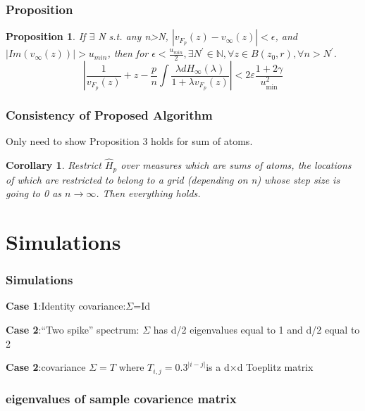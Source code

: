 \documentclass[aspectratio=169, 10pt, utf8, mathserif]{beamer}
\newtheorem{prop}{Proposition}
\newtheorem{cor}{Corollary}
\begin{document}
\begin{frame}
\frametitle{Proposition}
\begin{prop}
If $\exists$ N s.t. any n>N, $|v_{F_p}(z)-v_{\infty}(z)|<\epsilon$, and $|Im(v_{\infty}(z))|>u_{min}$, then 
for $
\epsilon<\frac{u_{min}}{2},\exists N^{\prime} \in \mathbb{N}, \forall z \in B\left(z_{0}, r\right), \forall n>N^{\prime}
$.
$$
\left|\frac{1}{v_{F_{p}}(z)}+z-\frac{p}{n} \int \frac{\lambda d H_{\infty}(\lambda)}{1+\lambda v_{F_{p}}(z)}\right|<2 \varepsilon \frac{1+2 \gamma}{u_{\min }^{2}}
$$
\end{prop}
\end{frame}
\begin{frame}
	\frametitle{Consistency of Proposed Algorithm}
	Only need to show Proposition 3 holds for sum of atoms.
	\begin{cor}
	Restrict $\hat{H}_p$  over measures which are sums of atoms, the locations of which are restricted to belong to a grid (depending on n) whose step size is going to 0 as $n\to \infty$. Then everything holds.
\end{cor} 
\end{frame}


\section{Simulations}

\begin{frame}
	\frametitle{Simulations}
	\textbf{Case 1}:Identity covariance:$\Sigma$=Id
	
	\vspace*{ 0.7cm }
	\textbf{Case 2}:“Two spike” spectrum: $\Sigma$ has d/2 eigenvalues equal to 1 and d/2 equal to 2
	
		\vspace*{ 0.7cm }
\textbf{Case 2}:covariance $\Sigma= T$ where
$T_{i,j}= 0.3^{\vert i-j\vert}$is a d×d Toeplitz matrix
\end{frame}

\begin{frame}
\frametitle{eigenvalues of sample covarience matrix}
\begin{figure}[htbp]
	\quad
\quad
\quad
\end{figure}

\end{frame}
\end{document}
